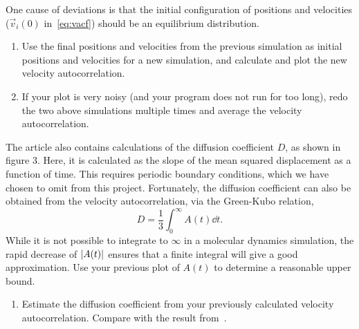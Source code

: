 \documentclass[11pt,british,a4paper]{report}
\begin{document}
One cause of deviations is that the initial configuration of positions and velocities (\(\vec{v}_i(0)\) in~\vref{eq:vacf}) should be an equilibrium distribution.
\begin{enumerate}[label=\roman*.,resume]
    \item Use the final positions and velocities from the previous simulation as initial positions and velocities for a new simulation, and calculate and plot the new velocity autocorrelation.
    \item If your plot is very noisy (and your program does not run for too long), redo the two above simulations multiple times and average the velocity autocorrelation.
\end{enumerate}

The article also contains calculations of the diffusion coefficient \(D\), as shown in figure 3. Here, it is calculated as the slope of the mean squared displacement as a function of time. This requires periodic boundary conditions, which we have chosen to omit from this project. Fortunately, the diffusion coefficient can also be obtained from the velocity autocorrelation, via the Green-Kubo relation,
\[
    D = \frac{1}{3}\int_0^\infty A(t)\dd{t}.
\]
While it is not possible to integrate to \(\infty\) in a molecular dynamics simulation, the rapid decrease of \(\abs{A(t)}\) ensures that a finite integral will give a good approximation. Use your previous plot of \(A(t)\) to determine a reasonable upper bound.

\begin{enumerate}[label=\roman*.,resume]
    \item Estimate the diffusion coefficient from your previously calculated velocity autocorrelation. Compare with the result from~\cite{Rahman_1964}.
\end{enumerate}

\end{document}
